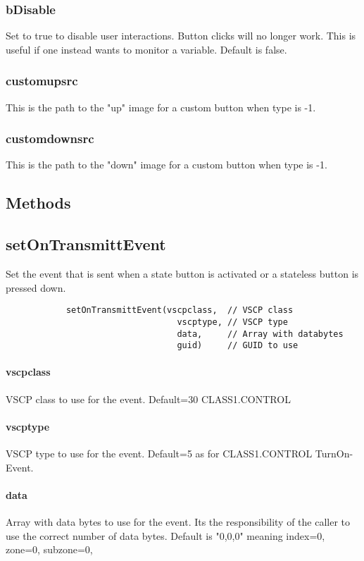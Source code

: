 \documentclass{article}
\begin{document}
        \subsubsection*{bDisable}
        Set to true to disable user interactions. Button clicks will no longer
        work. This is useful if one instead wants to monitor a variable. Default is false. 
        \subsubsection*{customupsrc}
        This is the path to the "up" image for a custom button when type is -1.
        \subsubsection*{customdownsrc}
        This is the path to the "down" image for a custom button when type is -1.
        
        
        
        \subsection*{Methods}
        
        \subsection*{setOnTransmittEvent}
        Set the event that is sent when a state button is activated or a stateless
        button is pressed down.
        \begin{verbatim}
            setOnTransmittEvent(vscpclass,  // VSCP class
                                  vscptype, // VSCP type
                                  data,     // Array with databytes   
                                  guid)     // GUID to use
        \end{verbatim}
        \paragraph*{vscpclass}
        VSCP class to use for the event. Default=30 CLASS1.CONTROL
        \paragraph*{vscptype}
        VSCP type to use for the event. Default=5 as for CLASS1.CONTROL TurnOn-Event.
        \paragraph*{data}
        Array with data bytes to use for the event. Its the responsibility
        of the caller to use the correct number of data bytes. Default
        is "0,0,0" meaning index=0, zone=0, subzone=0,
\end{document}
